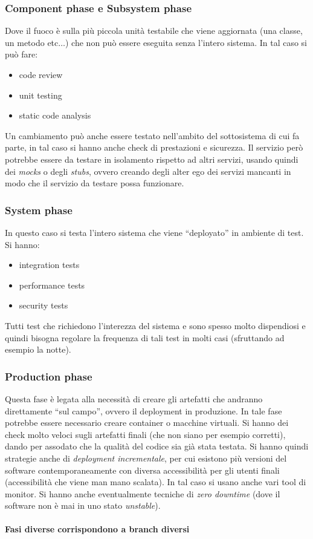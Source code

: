 \documentclass[a4paper,12pt, oneside]{book}
\begin{document}
\subsubsection{Component phase e Subsystem phase}
Dove il fuoco è sulla più piccola unità testabile che viene aggiornata (una
classe, un metodo etc$\ldots$) che non può essere eseguita senza l'intero
sistema. In tal caso si può fare:
\begin{itemize}
  \item code review
  \item unit testing
  \item static code analysis
\end{itemize}
Un cambiamento può anche essere testato nell'ambito del sottosistema di cui fa
parte, in tal caso si hanno anche check di prestazioni e sicurezza. Il servizio
però potrebbe essere da testare in isolamento rispetto ad altri servizi, usando
quindi dei \textit{mocks} o degli \textit{stubs}, ovvero creando degli alter ego
dei servizi mancanti in modo che il servizio da testare possa funzionare.
\subsubsection{System phase}
In questo caso si testa l'intero sistema che viene ``deployato'' in ambiente di
test. Si hanno:
\begin{itemize}
  \item integration tests
  \item performance tests
  \item security tests
\end{itemize}
Tutti test che richiedono l'interezza del sistema e sono spesso molto
dispendiosi e quindi bisogna regolare la frequenza di tali test in molti casi
(sfruttando ad esempio la notte).
\subsubsection{Production phase}
Questa fase è legata alla necessità di creare gli artefatti che andranno
direttamente ``sul campo'', ovvero il deployment in produzione. In tale fase
potrebbe essere necessario creare container o macchine virtuali. Si
hanno dei check molto veloci sugli artefatti finali (che non siano per esempio
corretti), dando per assodato che la qualità del codice sia già stata
testata. Si hanno quindi strategie anche di \textit{deployment incrementale},
per cui esistono più versioni del software contemporaneamente con diversa
accessibilità per gli utenti finali (accessibilità che viene man mano
scalata). In tal caso si usano anche vari tool di monitor. Si hanno anche
eventualmente tecniche di \textit{zero downtime} (dove il software non è mai in
uno stato \textit{unstable}).\\
\\
\textbf{Fasi diverse corrispondono a branch diversi}
\end{document}
